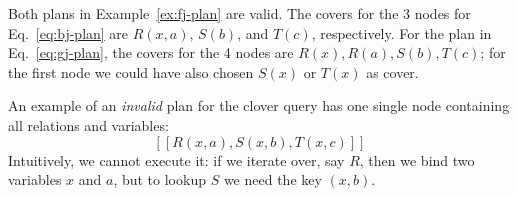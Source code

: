 
\begin{example}
  Both plans in Example~\ref{ex:fj-plan} are valid.  The covers for
  the 3 nodes for Eq.~\eqref{eq:bj-plan} are $R(x, a)$, $S(b)$, and
  $T(c)$, respectively. For the plan in Eq.~\eqref{eq:gj-plan}, the
  covers for the 4 nodes are $R(x), R(a), S(b), T(c)$; for the first
  node we could have also chosen $S(x)$ or $T(x)$ as cover.
\end{example}


\begin{example}
  An example of an \emph{invalid} plan for the clover query has one
  single node containing all relations and variables:
  $$[[R(x, a), S(x, b), T(x, c)]]$$
  Intuitively, we cannot execute it: if we iterate over, say $R$, then
  we bind two variables $x$ and $a$, but to lookup $S$ we
  need the key $(x,b)$.
\end{example}


